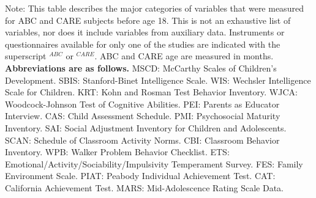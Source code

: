 \begin{sidewaystable}[H]
\begin{threeparttable}
\begin{tablenotes}
\item Note: This table describes the major categories of variables that were measured for ABC and CARE subjects before age 18. This is not an exhaustive list of variables, nor does it include variables from auxiliary data.  Instruments or questionnaires available for only one of the studies are indicated with the superscript $^{ABC}$ or $^{CARE}$.  ABC and CARE age are measured in months. \textbf{Abbreviations are as follows.}  MSCD: McCarthy Scales of Children's Development. SBIS: Stanford-Binet Intelligence Scale. WIS: Wechsler Intelligence Scale for Children. KRT: Kohn and Rosman Test Behavior Inventory. WJCA: Woodcock-Johnson Test of Cognitive Abilities. PEI: Parents as Educator Interview. CAS: Child Assessment Schedule. PMI: Psychosocial Maturity Inventory. SAI: Social Adjustment Inventory for Children and Adolescents. SCAN: Schedule of Classroom Activity Norms. CBI: Classroom Behavior Inventory. WPB: Walker Problem Behavior Checklist. ETS: Emotional/Activity/Sociability/Impulsivity Temperament Survey. FES: Family Environment Scale. PIAT: Peabody Individual Achievement Test. CAT: California Achievement Test. MARS: Mid-Adolescence Rating Scale Data.
\end{tablenotes}
\end{threeparttable}
\end{sidewaystable}

